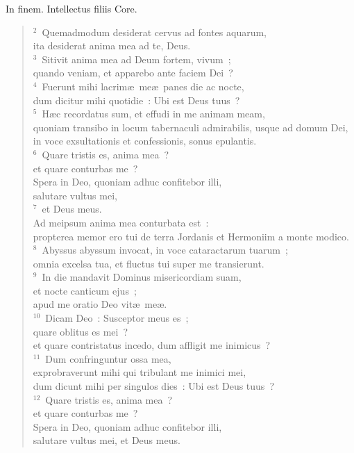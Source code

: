 \lettrine[lines=3,image=true,loversize=0.05,lraise=-0.03]{I}{}n finem. Intellectus filiis Core.
\begin{flushleft}\begin{verse}\vspace{6pt}${}^{2}$~Quemadmodum desiderat cervus ad fontes aquarum,\\ ita desiderat anima mea ad te, Deus.\\
${}^{3}$~Sitivit anima mea ad Deum fortem, vivum~;\\ quando veniam, et apparebo ante faciem Dei~?\\
${}^{4}$~Fuerunt mihi lacrim\ae\ me\ae\ panes die ac nocte,\\ dum dicitur mihi quotidie~: Ubi est Deus tuus~?\\
${}^{5}$~H\ae c recordatus sum, et effudi in me animam meam,\\ quoniam transibo in locum tabernaculi admirabilis, usque ad domum Dei,\\ in voce exsultationis et confessionis, sonus epulantis.\\
${}^{6}$~Quare tristis es, anima mea~?\\ et quare conturbas me~?\\ Spera in Deo, quoniam adhuc confitebor illi,\\ salutare vultus mei,\\
${}^{7}$~et Deus meus.\\ Ad meipsum anima mea conturbata est~:\\ propterea memor ero tui de terra Jordanis et Hermoniim a monte modico.\\
${}^{8}$~Abyssus abyssum invocat, in voce cataractarum tuarum~;\\ omnia excelsa tua, et fluctus tui super me transierunt.\\
${}^{9}$~In die mandavit Dominus misericordiam suam,\\ et nocte canticum ejus~;\\ apud me oratio Deo vit\ae\ me\ae .\\
${}^{10}$~Dicam Deo~: Susceptor meus es~;\\ quare oblitus es mei~?\\ et quare contristatus incedo, dum affligit me inimicus~?\\
${}^{11}$~Dum confringuntur ossa mea,\\ exprobraverunt mihi qui tribulant me inimici mei,\\ dum dicunt mihi per singulos dies~: Ubi est Deus tuus~?\\
${}^{12}$~Quare tristis es, anima mea~?\\ et quare conturbas me~?\\ Spera in Deo, quoniam adhuc confitebor illi,\\ salutare vultus mei, et Deus meus.\end{verse}\end{flushleft}



